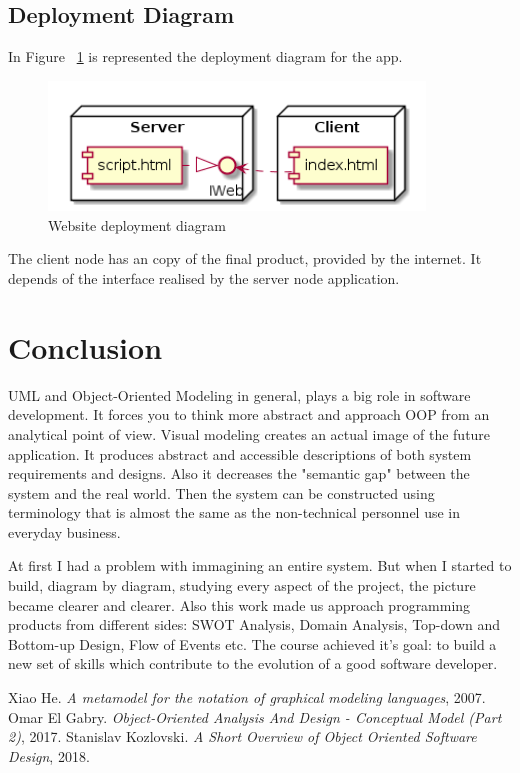 \documentclass[12pt,a4paper,titlepage]{article}
\begin{document}
\subsection{Deployment Diagram}
In Figure ~\ref{fig:9deploy} is represented the deployment diagram for the app.
\begin{figure}[H]
\centering
	\includegraphics[width=10cm]{9deploy}
	\caption{Website deployment diagram}
	\label{fig:9deploy}
\end{figure}
The client node has an copy of the final product, provided by the internet. It depends of the interface realised by the server node application.\par

\section{Conclusion}
UML and Object-Oriented Modeling in general, plays a big role in software development. It forces you to think more abstract and approach OOP from an analytical point of view. Visual modeling creates an actual image of the future application. It produces abstract and accessible descriptions of both system requirements and designs. Also it decreases the "semantic gap" between the system and the real world. Then the system can be constructed using terminology that is almost the same as the non-technical personnel use in everyday business.\par
At first I had a problem with immagining an entire system. But when I started to build, diagram by diagram, studying every aspect of the project, the picture became clearer and clearer.
Also this work made us approach programming products from different sides: SWOT Analysis, Domain Analysis, Top-down and Bottom-up Design, Flow of Events etc.
The course achieved it's goal: to build a new set of skills which contribute to the evolution of a good software developer.

\begin{thebibliography}{9}
Xiao He.
\textit{A metamodel for the notation of graphical modeling languages}, 2007.
Omar El Gabry.
\textit{Object-Oriented Analysis And Design - Conceptual Model (Part 2)}, 2017.
Stanislav Kozlovski.
\textit{A Short Overview of Object Oriented Software Design}, 2018.
\end{thebibliography}

\cleardoublepage
\end{document}
